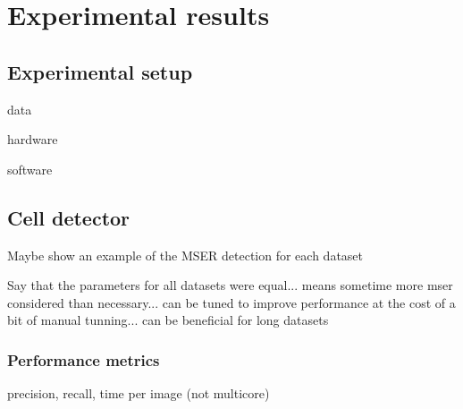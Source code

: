 \chapter{Experimental results }
\label{chap:results}
\notyetimplemented{}


	\section{Experimental setup}
	
		data
	
		hardware
		
		software

	\section{Cell detector }
		
		Maybe show an example of the MSER detection for each dataset
		
		Say that the parameters for all datasets were equal... means sometime more mser considered than necessary... can be tuned to improve performance at the cost of a bit of manual tunning... can be beneficial for long datasets
		
		\subsection{Performance metrics \statusnew}
			precision, recall, time per image (not multicore)
		
